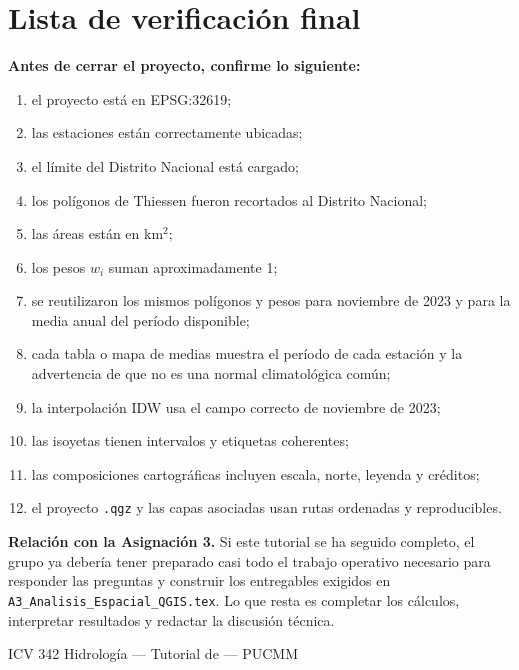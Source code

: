 \documentclass[11pt]{article}
\begin{document}
\section*{Lista de verificación final}

\begin{tealbox}
\textbf{Antes de cerrar el proyecto, confirme lo siguiente:}
\begin{enumerate}
  \item el proyecto está en EPSG:32619;
  \item las estaciones están correctamente ubicadas;
  \item el límite del Distrito Nacional está cargado;
  \item los polígonos de Thiessen fueron recortados al Distrito Nacional;
  \item las áreas están en km$^2$;
  \item los pesos $w_i$ suman aproximadamente 1;
  \item se reutilizaron los mismos polígonos y pesos para noviembre de 2023 y
        para la media anual del período disponible;
  \item cada tabla o mapa de medias muestra el período de cada estación y la
        advertencia de que no es una normal climatológica común;
  \item la interpolación IDW usa el campo correcto de noviembre de 2023;
  \item las isoyetas tienen intervalos y etiquetas coherentes;
  \item las composiciones cartográficas incluyen escala, norte, leyenda y créditos;
  \item el proyecto \texttt{.qgz} y las capas asociadas usan rutas ordenadas y reproducibles.
\end{enumerate}
\end{tealbox}

\begin{olivebox}
\textbf{Relación con la Asignación 3.}
Si este tutorial se ha seguido completo, el grupo ya debería tener preparado casi
todo el trabajo operativo necesario para responder las preguntas y construir los
entregables exigidos en \texttt{A3\_Analisis\_Espacial\_QGIS.tex}. Lo que resta es
completar los cálculos, interpretar resultados y redactar la discusión técnica.
\end{olivebox}

\vfill
\begin{center}
  {\small\color{midgrey} ICV 342 Hidrología — Tutorial de \qgis{} — PUCMM}
\end{center}
\end{document}
